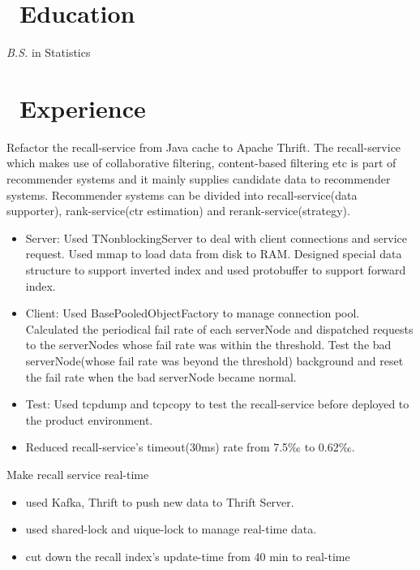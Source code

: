 \documentclass{resume}
\begin{document}



\section{\faGraduationCap\ Education}
\textit{B.S.} in Statistics

\section{\faUsers\ Experience}
Refactor the recall-service from Java cache to Apache Thrift. The recall-service which makes use of collaborative filtering, content-based filtering etc is part of recommender systems and it mainly supplies candidate data to recommender systems. Recommender systems can be divided into recall-service(data supporter), rank-service(ctr estimation) and rerank-service(strategy).
\begin{itemize}
  \item Server: Used TNonblockingServer to deal with client connections and service request. Used mmap to load data from disk to RAM. Designed special data structure to support inverted index and used protobuffer to support forward index.
  \item Client: Used BasePooledObjectFactory to manage connection pool. Calculated the periodical fail rate of each serverNode and dispatched requests to the serverNodes whose fail rate was within the threshold. Test the bad serverNode(whose fail rate was beyond the threshold) background and reset the fail rate when the bad serverNode became normal.
  \item Test: Used tcpdump and tcpcopy to test the recall-service before deployed to the product environment.
  \item Reduced recall-service's timeout(30ms) rate from 7.5‰ to 0.62‰.
\end{itemize}

Make recall service real-time
\begin{itemize}
  \item used Kafka, Thrift to push new data to Thrift Server.
  \item used shared-lock and uique-lock to manage real-time data.
  \item cut down the recall index's update-time from 40 min to real-time
\end{itemize}
\end{document}
